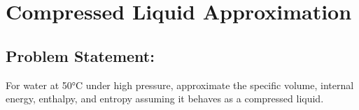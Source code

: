 \documentclass[letterpaper,10pt,english]{jupyterBook}
\begin{document}
\section{Compressed Liquid Approximation}
\label{\detokenize{notebooks/Chapter2/Problem_6_Compressed_Liquid_Approximation:compressed-liquid-approximation}}\label{\detokenize{notebooks/Chapter2/Problem_6_Compressed_Liquid_Approximation::doc}}

\subsection{Problem Statement:}
\label{\detokenize{notebooks/Chapter2/Problem_6_Compressed_Liquid_Approximation:problem-statement}}
\sphinxAtStartPar
For water at 50°C under high pressure, approximate the specific volume, internal energy, enthalpy, and entropy
assuming it behaves as a compressed liquid.
\end{document}
